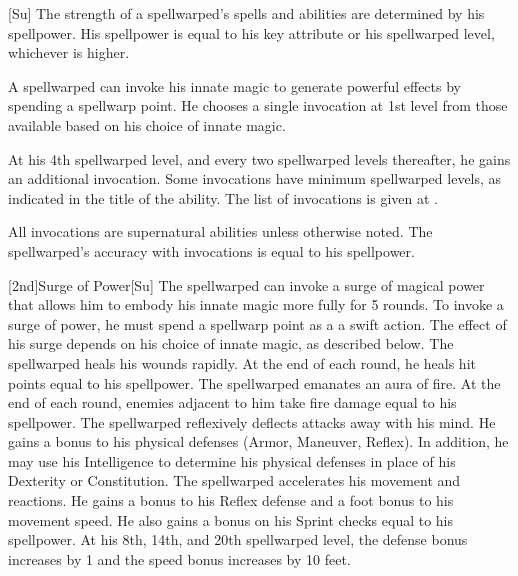 [Su]
The strength of a spellwarped's spells and abilities are determined by his spellpower.
His spellpower is equal to his key attribute or his spellwarped level, whichever is higher.

A spellwarped can invoke his innate magic to generate powerful effects by spending a spellwarp point.
He chooses a single invocation at 1st level from those available based on his choice of innate magic.

At his 4th spellwarped level, and every two spellwarped levels thereafter, he gains an additional invocation.
Some invocations have minimum spellwarped levels, as indicated in the title of the ability.
The list of invocations is given at .

All invocations are supernatural abilities unless otherwise noted.
The spellwarped's accuracy with invocations is equal to his spellpower.

[2nd]{Surge of Power}[Su]
The spellwarped can invoke a surge of magical power that allows him to embody his innate magic more fully for 5 rounds.
To invoke a surge of power, he must spend a spellwarp point as a a swift action.
The effect of his surge depends on his choice of innate magic, as described below.
    The spellwarped heals his wounds rapidly.
    At the end of each round, he heals hit points equal to his spellpower.
    The spellwarped emanates an aura of fire.
    At the end of each round, enemies adjacent to him take fire damage equal to his spellpower.
    The spellwarped reflexively deflects attacks away with his mind.
    He gains a  bonus to his physical defenses (Armor, Maneuver, Reflex).
    In addition, he may use his Intelligence to determine his physical defenses in place of his Dexterity or Constitution.
    The spellwarped accelerates his movement and reactions.
    He gains a  bonus to his Reflex defense and a  foot bonus to his movement speed.
    He also gains a bonus on his Sprint checks equal to his spellpower.
    At his 8th, 14th, and 20th spellwarped level, the defense bonus increases by 1 and the speed bonus increases by 10 feet.

